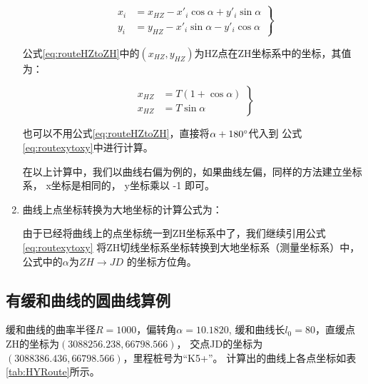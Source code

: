 \begin{enumerate}
\begin{equation}
\left . \begin{aligned}
x_i &= x_{HZ} - x'_i  \cos \alpha + y'_i \sin \alpha \\
y_i &= y_{HZ}  -  x'_i \sin \alpha -  y'_i \cos \alpha
\end{aligned} \right \}
\label{eq:routeHZtoZH}
\end{equation}

公式\ref{eq:routeHZtoZH}中的$(x_{HZ}, y_{HZ})$为HZ点在ZH坐标系中的坐标，其值为：

\begin{equation}
\left . \begin{aligned}
x_{HZ} &= T (1 +  \cos \alpha) \\
x_{HZ} &=  T \sin \alpha
\end{aligned} \right \}
\label{eq:routeHZXY}
\end{equation}

也可以不用公式\ref{eq:routeHZtoZH}，直接将$\alpha+180^\circ$代入到
公式\ref{eq:routexytoxy}中进行计算。

在以上计算中，我们以曲线右偏为例的，如果曲线左偏，同样的方法建立坐标系，
x坐标是相同的， y坐标乘以 -1 即可。

\item 曲线上点坐标转换为大地坐标的计算公式为：

由于已经将曲线上的点坐标统一到ZH坐标系中了，我们继续引用公式\ref{eq:routexytoxy}
将ZH切线坐标系坐标转换到大地坐标系（测量坐标系）中，公式中的$\alpha$为$ZH \rightarrow JD$
的坐标方位角。

\end{enumerate}


\subsection{有缓和曲线的圆曲线算例}

缓和曲线的曲率半径$R=1000$，偏转角$\alpha =10.1820$,
缓和曲线长$l_0=80$，直缓点ZH的坐标为$(3088256.238, 66798.566)$，
交点JD的坐标为$(3088386.436, 66798.566)$，里程桩号为``K5+''。
计算出的曲线上各点坐标如表\ref{tab:HYRoute}所示。

